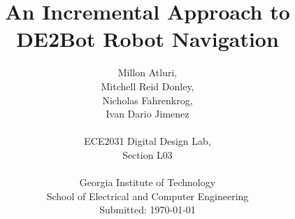 \documentclass[12pt,conference,onecolumn]{IEEEtran} %
\begin{document}
\title{\vspace*{30mm}
An Incremental Approach to DE2Bot Robot Navigation}

\author{
Millon Atluri,\\
Mitchell Reid Donley,\\
Nicholas Fahrenkrog,\\
Ivan Dario Jimenez

\vspace*{30mm}\\
ECE2031 Digital Design Lab,\\
Section L03\\
\vspace*{30mm}\\
Georgia Institute of Technology\\
School of Electrical and Computer Engineering\\
Submitted: \today
}

\maketitle

\clearpage

\end{document}

